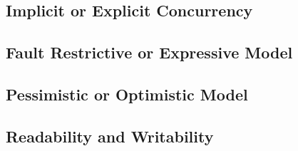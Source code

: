 \label{sec:stm_eval}
\subsection{Implicit or Explicit Concurrency}
\subsection{Fault Restrictive or Expressive Model}
\subsection{Pessimistic or Optimistic Model}
\subsection{Readability and Writability}
\worksheetend